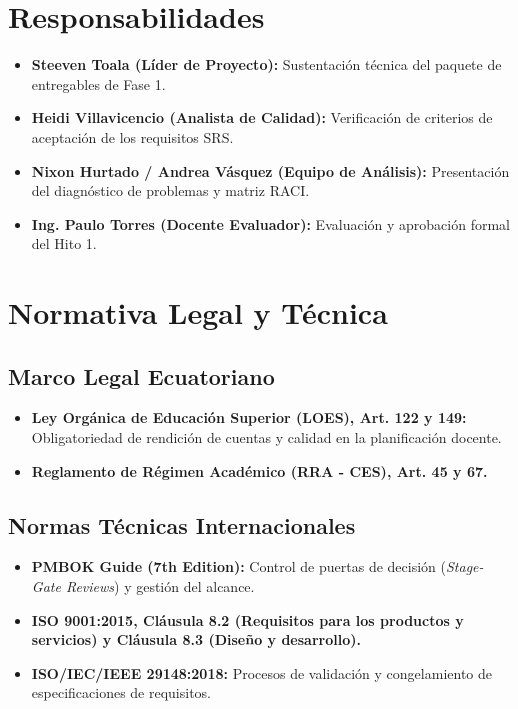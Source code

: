 \documentclass[12pt,a4paper]{article}
\begin{document}
\section{Responsabilidades}
\begin{itemize}[leftmargin=1.5em, itemsep=2pt]
    \item \textbf{Steeven Toala (Líder de Proyecto):} Sustentación técnica del paquete de entregables de Fase 1.
    \item \textbf{Heidi Villavicencio (Analista de Calidad):} Verificación de criterios de aceptación de los requisitos SRS.
    \item \textbf{Nixon Hurtado / Andrea Vásquez (Equipo de Análisis):} Presentación del diagnóstico de problemas y matriz RACI.
    \item \textbf{Ing. Paulo Torres (Docente Evaluador):} Evaluación y aprobación formal del Hito 1.
\end{itemize}

\section{Normativa Legal y Técnica}
\subsection{Marco Legal Ecuatoriano}
\begin{itemize}[leftmargin=1.5em, itemsep=2pt]
    \item \textbf{Ley Orgánica de Educación Superior (LOES), Art. 122 y 149:} Obligatoriedad de rendición de cuentas y calidad en la planificación docente.
    \item \textbf{Reglamento de Régimen Académico (RRA - CES), Art. 45 y 67.}
\end{itemize}
\subsection{Normas Técnicas Internacionales}
\begin{itemize}[leftmargin=1.5em, itemsep=2pt]
    \item \textbf{PMBOK Guide (7th Edition):} Control de puertas de decisión (\textit{Stage-Gate Reviews}) y gestión del alcance.
    \item \textbf{ISO 9001:2015, Cláusula 8.2 (Requisitos para los productos y servicios) y Cláusula 8.3 (Diseño y desarrollo).}
    \item \textbf{ISO/IEC/IEEE 29148:2018:} Procesos de validación y congelamiento de especificaciones de requisitos.
\end{itemize}
\end{document}
